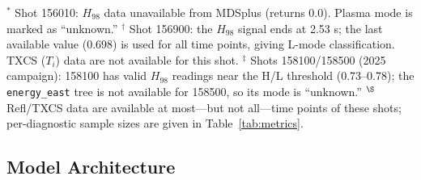 \documentclass[a4paper,12pt]{article}
\begin{document}
\begin{table}[htbp]
\centering\footnotesize
\caption{Test set characteristics. All 7 shots (2024 and 2025 EAST campaigns) are excluded from the training set. The $T_e$ range is the range of mtanh-fitted core $T_e$ across the shot's time points.}
\label{tab:testset}
\vspace{4pt}
\footnotesize{$^*$ Shot 156010: $H_{98}$ data unavailable from MDSplus (returns 0.0). Plasma mode is marked as ``unknown.'' $^{\dagger}$ Shot 156900: the $H_{98}$ signal ends at 2.53 s; the last available value (0.698) is used for all time points, giving L-mode classification. TXCS ($T_i$) data are not available for this shot. $^{\ddagger}$ Shots 158100/158500 (2025 campaign): 158100 has valid $H_{98}$ readings near the H/L threshold (0.73--0.78); the \texttt{energy\_east} tree is not available for 158500, so its mode is ``unknown.'' $^{\S}$ Refl/TXCS data are available at most---but not all---time points of these shots; per-diagnostic sample sizes are given in Table~\ref{tab:metrics}.}
\end{table}

\subsection{Model Architecture}
\end{document}
